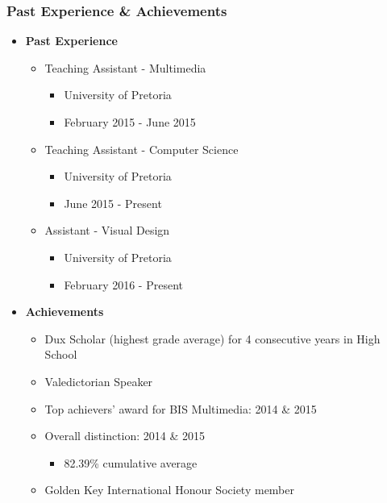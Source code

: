 \documentclass{article}
\begin{document}
\subsubsection{Past Experience \& Achievements}
\begin{itemize}
	\item \textbf{Past Experience}
	\begin{itemize}
		\item Teaching Assistant - Multimedia
		\begin{itemize}
			\item University of Pretoria
			\item February 2015 - June 2015
		\end{itemize}
		\item Teaching Assistant - Computer Science
		\begin{itemize}
			\item University of Pretoria
			\item June 2015 - Present
		\end{itemize}
		\item Assistant - Visual Design
		\begin{itemize}
			\item University of Pretoria
			\item February 2016 - Present
		\end{itemize}
	\end{itemize}
	\item \textbf{Achievements}
	\begin{itemize}
		\item Dux Scholar (highest grade average) for 4 consecutive years in High School
		\item Valedictorian Speaker
		\item Top achievers' award for BIS Multimedia: 2014 \& 2015
		\item Overall distinction: 2014 \& 2015
		\begin{itemize}
			\item 82.39\% cumulative average
		\end{itemize}
		\item Golden Key International Honour Society member
	\end{itemize}
\end{itemize}
\end{document}
